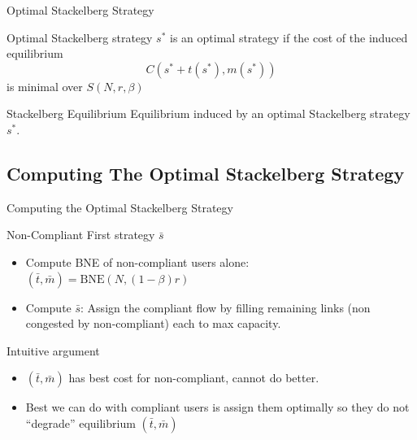 \documentclass[xcolor=svgnames, english, smaller]{beamer}
\theoremstyle{plain}
\theoremstyle{definition}
\theoremstyle{plain}
\theoremstyle{plain}
\begin{document}
\begin{frame}{Optimal Stackelberg Strategy}

\begin{block}{Optimal Stackelberg strategy}
$s^*$ is an optimal strategy if the cost of the induced equilibrium
\[
C(s^* + t(s^*), m(s^*))
\]
is minimal over $S(N, r, \beta)$
\end{block}



\begin{block}{Stackelberg Equilibrium}
Equilibrium induced by an optimal Stackelberg strategy $s^*$.
\end{block}

\end{frame}


\subsection{Computing The Optimal Stackelberg Strategy}

\begin{frame}{Computing the Optimal Stackelberg Strategy}

\begin{block}{Non-Compliant First strategy $\bar{s}$}
\begin{itemize}
\item \alert<3>{Compute BNE of non-compliant users alone: $(\bar{t}, \bar{m}) = \text{BNE}(N, (1-\beta)r)$}
\item Compute $\bar{s}$: Assign the compliant flow by filling remaining links (non congested by non-compliant) each to max capacity.
\end{itemize}
\end{block}

\pause 
Intuitive argument
\begin{itemize}
\item $(\bar{t}, \bar{m})$ has best cost for non-compliant, cannot do better.
\item Best we can do with compliant users is assign them optimally so they do not ``degrade'' equilibrium $(\bar{t}, \bar{m})$
\end{itemize}


\end{frame}
\end{document}
